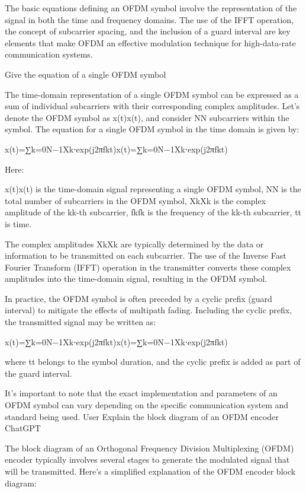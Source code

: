 The basic equations defining an OFDM symbol involve the representation of the signal in both the time and frequency domains. The use of the IFFT operation, the concept of subcarrier spacing, and the inclusion of a guard interval are key elements that make OFDM an effective modulation technique for high-data-rate communication systems.





Give the equation of a single OFDM symbol


The time-domain representation of a single OFDM symbol can be expressed as a sum of individual subcarriers with their corresponding complex amplitudes. Let's denote the OFDM symbol as x(t)x(t), and consider NN subcarriers within the symbol. The equation for a single OFDM symbol in the time domain is given by:

x(t)=∑k=0N−1Xk⋅exp(j2πfkt)x(t)=∑k=0N−1​Xk​⋅exp(j2πfk​t)

Here:

x(t)x(t) is the time-domain signal representing a single OFDM symbol,
NN is the total number of subcarriers in the OFDM symbol,
XkXk​ is the complex amplitude of the kk-th subcarrier,
fkfk​ is the frequency of the kk-th subcarrier,
tt is time.

The complex amplitudes XkXk​ are typically determined by the data or information to be transmitted on each subcarrier. The use of the Inverse Fast Fourier Transform (IFFT) operation in the transmitter converts these complex amplitudes into the time-domain signal, resulting in the OFDM symbol.

In practice, the OFDM symbol is often preceded by a cyclic prefix (guard interval) to mitigate the effects of multipath fading. Including the cyclic prefix, the transmitted signal may be written as:

x(t)=∑k=0N−1Xk⋅exp(j2πfkt)x(t)=∑k=0N−1​Xk​⋅exp(j2πfk​t)

where tt belongs to the symbol duration, and the cyclic prefix is added as part of the guard interval.

It's important to note that the exact implementation and parameters of an OFDM symbol can vary depending on the specific communication system and standard being used.
User
Explain the block diagram of an OFDM encoder
ChatGPT

The block diagram of an Orthogonal Frequency Division Multiplexing (OFDM) encoder typically involves several stages to generate the modulated signal that will be transmitted. Here's a simplified explanation of the OFDM encoder block diagram:

